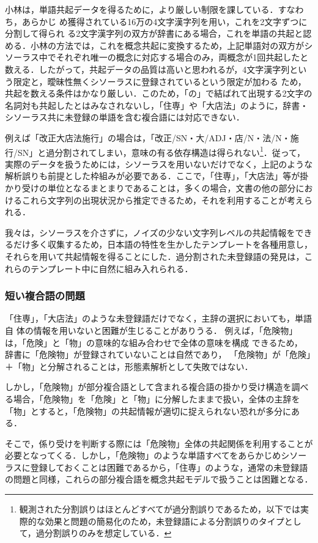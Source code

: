 小林は，単語共起データを得るために，より厳しい制限を課している．すなわち，あらかじ\break
め獲得されている16万の4文字漢字列を用い\cite{田中1992}，これを2文字ずつに分割して得られ\break
る2文字漢字列の双方が辞書にある場合，これを単語の共起と認める．小林の方法では，これを概念共起に変換するため，上記単語対の双方がシソーラス中でそれぞれ唯一の概念に対応する場合のみ，両概念が1回共起したと数える．したがって，共起データの品質は高いと思われるが，4文字漢字列という限定と，曖昧性無くシソーラスに登録されているという限定が加わる\break
ため，共起を数える条件はかなり厳しい．このため，「の」で結ばれて出現する2文字の名詞対も共起したとはみなされないし，「住専」や「大店法」のように，辞書・シソーラス共に未登録の単語を含む複合語には対応できない．

例えば「改正大店法施行」の場合は，「改正/SN・大/ADJ・店/N・法/N・施行/SN」と過分割されてしまい，意味の有る依存構造は得られない\footnote{観測された分割誤りはほとんどすべてが過分割誤りであるため，以下では実際的な効果と問題の簡易化のため，未登録語による分割誤りのタイプとして，過分割誤りのみを想定している．}．従って，実際のデータを扱うためには，シソーラスを用いないだけでなく，上記のような解析誤りも前提とした枠組みが必要である．ここで，「住専」，「大店法」等が掛かり受けの単位となるまとまりであることは，多くの場合，文書の他の部分におけるこれら文字列の出現状況から推定できるため，それを利用することが考えられる．

我々は，シソーラスを介さずに，ノイズの少ない文字列レベルの共起情報をできるだけ多く収集するため，日本語の特性を生かしたテンプレートを各種用意し，それらを用いて共起情報を得ることにした．過分割された未登録語の発見は，これらのテンプレート中に自然に組み入れられる．

\subsubsection{短い複合語の問題}\label{短い複合語の問題}
「住専」，「大店法」のような未登録語だけでなく，主辞の選択においても，単語自
体の情報を用いないと困難が生じることがありうる．
例えば，「危険物」は，「危険」と「物」の意味的な組み合わせで全体の意味を構成
できるため，
辞書に「危険物」が登録されていないことは自然であり，
「危険物」が「危険」＋「物」と分解されることは，形態素解析として失敗ではない．

しかし，「危険物」が部分複合語として含まれる複合語の掛かり受け構造を調べる場合，「危険物」を「危険」と「物」に分解したままで扱い，全体の主辞を「物」とすると，「危険物」の共起情報が適切に捉えられない恐れが多分にある．

そこで，係り受けを判断する際には「危険物」全体の共起関係を利用することが必要となってくる．しかし，「危険物」のような単語すべてをあらかじめシソーラスに登録しておくことは困難であるから，「住専」のような，通常の未登録語の問題と同様，これらの部分複合語を概念共起モデルで扱うことは困難となる．

